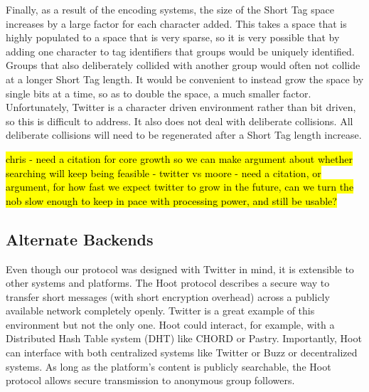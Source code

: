 Finally, as a result of the encoding systems, the size of the Short Tag space increases by a large factor for each character added. This takes a space that is highly populated to a space that is very sparse, so it is very possible that by adding one character to tag identifiers that groups would be uniquely identified. Groups that also deliberately collided with another group would often not collide at a longer Short Tag length. It would be convenient to instead grow the space by single bits at a time, so as to double the space, a much smaller factor. Unfortunately, Twitter is a character driven environment rather than bit driven, so this is difficult to address. It also does not deal with deliberate collisions. All deliberate collisions will need to be regenerated after a Short Tag length increase.


\hl{
chris 
- need a citation for core growth so we can make argument about whether searching will keep being feasible
- twitter vs moore
- need a citation, or argument, for how fast we expect twitter to grow in the future, can we turn the nob slow enough to keep in pace with processing power, and still be usable? 
}

\subsection{Alternate Backends}

Even though our protocol was designed with Twitter in mind, it is extensible to other systems and platforms. The Hoot protocol describes a secure way to transfer short messages (with short encryption overhead) across a publicly available network completely openly. Twitter is a great example of this environment but not the only one. Hoot could interact, for example, with a Distributed Hash Table system (DHT) like CHORD or Pastry. Importantly, Hoot can interface with both centralized systems like Twitter or Buzz or decentralized systems. As long as the platform's content is publicly searchable, the Hoot protocol allows secure transmission to anonymous group followers.
